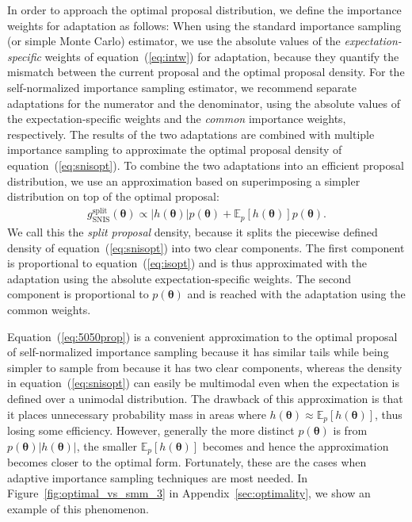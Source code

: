 \documentclass[12pt]{article}
\newenvironment{nalign}{
    \begin{equation}
    \begin{aligned}
}{
    \end{aligned}
    \end{equation}
    \ignorespacesafterend
}
\begin{document}
%
%
In order to approach the optimal proposal distribution, we define the importance weights for adaptation as follows:
When using the standard importance sampling (or simple Monte Carlo) estimator, 
we use the absolute values of the \emph{expectation-specific} weights of equation~(\ref{eq:intw})
for adaptation, because they quantify the mismatch
between the current proposal and the optimal proposal density.
For the self-normalized importance sampling estimator,
%
    we recommend separate adaptations for the numerator and the denominator,
    using the absolute values
    of the expectation-specific weights and the \emph{common} importance weights, respectively.
    The results of the two adaptations
    are combined with multiple importance sampling to approximate the optimal proposal density
    of equation~(\ref{eq:snisopt}).
%
%
%
%
%
%
%
%
To combine the two adaptations into an efficient proposal distribution, we use an approximation based on superimposing a simpler distribution on top of the optimal proposal:
%
%
\begin{nalign} \label{eq:5050prop}
g_{\text{SNIS}}^{\text{split}} (\boldsymbol{\theta}) \propto | h(\boldsymbol{\theta}) | p (\boldsymbol{\theta})  + \mathbb{E}_p [h(\boldsymbol{\theta})] p (\boldsymbol{\theta}) .
\end{nalign}
We call this the \emph{split proposal} density, because it splits the piecewise defined
density of equation~(\ref{eq:snisopt}) into two clear components.
The first component is proportional to equation~(\ref{eq:isopt}) and is thus approximated
with the adaptation using the absolute expectation-specific weights.
The second component is proportional to $p (\boldsymbol{\theta})$ and is reached with
the adaptation using the common weights.


%
%
Equation~(\ref{eq:5050prop}) is a convenient approximation to the optimal proposal
of self-normalized importance sampling
because it has
similar tails while being simpler to sample from
because it has two clear components, whereas the density in
equation~(\ref{eq:snisopt}) can easily be multimodal even when the expectation is defined over a unimodal distribution.
The drawback of this approximation is that it places unnecessary probability mass in areas where
$h(\boldsymbol{\theta}) \approx \mathbb{E}_p [h(\boldsymbol{\theta})] $, thus losing some efficiency.
However, generally the more distinct $p (\boldsymbol{\theta})$ is from
$p (\boldsymbol{\theta}) |h (\boldsymbol{\theta})|$, the smaller
$\mathbb{E}_p [h(\boldsymbol{\theta})]$ becomes and hence the approximation becomes closer to the optimal form.
%
%
Fortunately, these are the cases
when adaptive importance sampling techniques are most needed.
In Figure~\ref{fig:optimal_vs_smm_3} in Appendix~\ref{sec:optimality}, we show an example
of this phenomenon.
\end{document}
